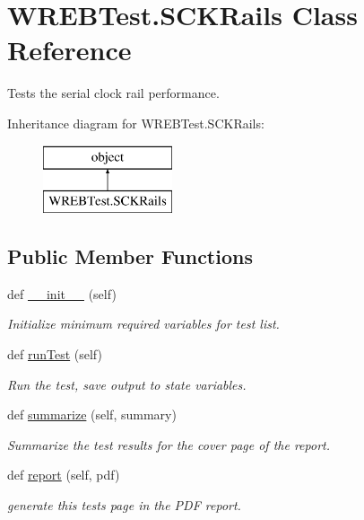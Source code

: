 \hypertarget{class_w_r_e_b_test_1_1_s_c_k_rails}{}\section{W\+R\+E\+B\+Test.\+S\+C\+K\+Rails Class Reference}
\label{class_w_r_e_b_test_1_1_s_c_k_rails}


Tests the serial clock rail performance.  


Inheritance diagram for W\+R\+E\+B\+Test.\+S\+C\+K\+Rails\+:\begin{figure}[H]
\begin{center}
\leavevmode
\includegraphics[height=2.000000cm]{class_w_r_e_b_test_1_1_s_c_k_rails}
\end{center}
\end{figure}
\subsection*{Public Member Functions}
\begin{DoxyCompactItemize}
\item 
def \hyperlink{class_w_r_e_b_test_1_1_s_c_k_rails_a3b97f57578a878d60be2dc318b75ec40}{\+\_\+\+\_\+init\+\_\+\+\_\+} (self)
\begin{DoxyCompactList}\small\item\em Initialize minimum required variables for test list. \end{DoxyCompactList}\item 
def \hyperlink{class_w_r_e_b_test_1_1_s_c_k_rails_a545777a2849f4e2262d16432d209e128}{run\+Test} (self)
\begin{DoxyCompactList}\small\item\em Run the test, save output to state variables. \end{DoxyCompactList}\item 
def \hyperlink{class_w_r_e_b_test_1_1_s_c_k_rails_a6a3308b1318ead9249d8e14f521976c7}{summarize} (self, summary)
\begin{DoxyCompactList}\small\item\em Summarize the test results for the cover page of the report. \end{DoxyCompactList}\item 
def \hyperlink{class_w_r_e_b_test_1_1_s_c_k_rails_ae04fcf6fdd603e231df18d9e740b8168}{report} (self, pdf)
\begin{DoxyCompactList}\small\item\em generate this test\textquotesingle{}s page in the P\+DF report. \end{DoxyCompactList}\end{DoxyCompactItemize}


